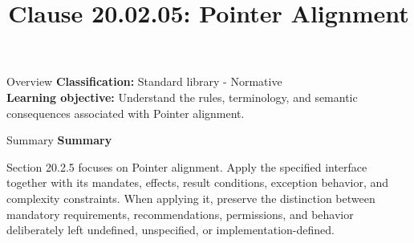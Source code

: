 \documentclass[10pt,letterpaper]{article}
\title{Clause 20.02.05: Pointer Alignment}
\author{}
\date{}
\begin{document}
\maketitle
\begin{CornellOverviewBox}{Overview}
\textbf{Classification:} Standard library - Normative\\[2pt]
\textbf{Learning objective:} Understand the rules, terminology, and semantic consequences associated with Pointer alignment.
\end{CornellOverviewBox}\begin{CornellSummaryBox}{Summary}
{\sffamily\bfseries\color{Accent} Summary}\par\vspace{3pt}Section 20.2.5 focuses on Pointer alignment. Apply the specified interface together with its mandates, effects, result conditions, exception behavior, and complexity constraints. When applying it, preserve the distinction between mandatory requirements, recommendations, permissions, and behavior deliberately left undefined, unspecified, or implementation-defined.
\end{CornellSummaryBox}
\end{document}
